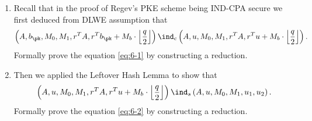 \begin{problem}\label{p6}
    \leavevmode\par
    \begin{enumerate}[label=(\roman*)]
        \item Recall that in the proof of Regev's PKE scheme being IND-CPA secure we first deduced from DLWE assumption that
        \begin{equation}\label{eq:6-1}
            \left(A, b_\pk, M_0, M_1, r^TA, r^Tb_\pk + M_b \cdot \left\lfloor\frac{q}{2}\right\rfloor\right)
            \ind_c
            \left(A, u, M_0, M_1, r^TA, r^Tu + M_b \cdot \left\lfloor\frac{q}{2}\right\rfloor\right).
        \end{equation}
        Formally prove the equation \eqref{eq:6-1} by constructing a reduction.

        \item Then we applied the Leftover Hash Lemma to show that
        \begin{equation}\label{eq:6-2}
            \left(A, u, M_0, M_1, r^TA, r^Tu + M_b \cdot \left\lfloor\frac{q}{2}\right\rfloor\right)
            \ind_s
            \left(A, u, M_0, M_1, u_1, u_2\right).
        \end{equation}
        Formally prove the equation \eqref{eq:6-2} by constructing a reduction.
    \end{enumerate}
\end{problem}



